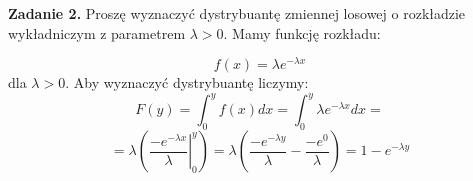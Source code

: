 {\bf Zadanie 2.}  \newline
Proszę wyznaczyć dystrybuantę zmiennej losowej o rozkładzie wykładniczym z parametrem $ \lambda > 0.$
 \newline 
Mamy funkcję rozkładu:

$$ f(x) = \lambda e^{-\lambda x}$$
dla $ \lambda > 0.$ 
\newline Aby wyznaczyć dystrybuantę liczymy:
$$ F(y)=\int_{0}^{y} f(x) dx = \int_{0}^{y}  \lambda e^{-\lambda x} dx =  $$
$$=\lambda(\left.\frac{-e^{-\lambda x}}{\lambda}\right|_0^y) = \lambda (\frac{-e^{-\lambda y}}{\lambda}-\frac{-e^{0}}{\lambda}) = 1- e^{-\lambda y} $$
